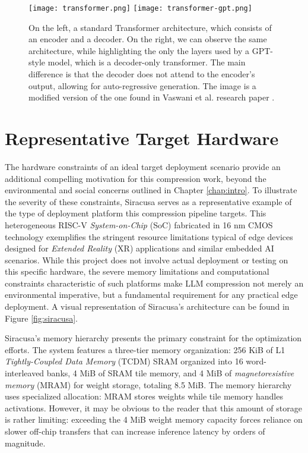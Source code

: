 \begin{figure}[htbp]
    \centering
    \texttt{[image: transformer.png]}
    \hfill
    \texttt{[image: transformer-gpt.png]}
    \caption[Comparison of Transformer Architectures]{On the left, a standard Transformer architecture, which consists of an encoder and a decoder. On the right, we can observe the same architecture, while highlighting the only the layers used by a GPT-style model, which is a decoder-only transformer. The main difference is that the decoder does not attend to the encoder's output, allowing for auto-regressive generation. The image is a modified version of the one found in Vaswani et al. research paper \cite{attention_is_all_you_need}.}
    \label{fig:sidebyside}
\end{figure}

\section{Representative Target Hardware} \label{target_hardware}

The hardware constraints of an ideal target deployment scenario provide an additional compelling motivation for this compression work, beyond the environmental and social concerns outlined in Chapter \ref{chap:intro}. To illustrate the severity of these constraints, Siracusa \cite{target_hardware} serves as a representative example of the type of deployment platform this compression pipeline targets. This heterogeneous RISC-V \textit{System-on-Chip} (SoC) fabricated in 16 nm CMOS technology exemplifies the stringent resource limitations typical of edge devices designed for \textit{Extended Reality} (XR) applications and similar embedded AI scenarios. While this project does not involve actual deployment or testing on this specific hardware, the severe memory limitations and computational constraints characteristic of such platforms make LLM compression not merely an environmental imperative, but a fundamental requirement for any practical edge deployment. A visual representation of Siracusa's architecture can be found in Figure \ref{fig:siracusa}.

Siracusa's memory hierarchy presents the primary constraint for the optimization efforts. The system features a three-tier memory organization: 256 KiB of L1 \textit{Tightly-Coupled Data Memory} (TCDM) SRAM organized into 16 word-interleaved banks, 4 MiB of SRAM tile memory, and 4 MiB of \textit{magnetoresistive memory} (MRAM) for weight storage, totaling 8.5 MiB. The memory hierarchy uses specialized allocation: MRAM stores weights while tile memory handles activations. However, it may be obvious to the reader that this amount of storage is rather limiting: exceeding the 4 MiB weight memory capacity forces reliance on slower off-chip transfers that can increase inference latency by orders of magnitude.

